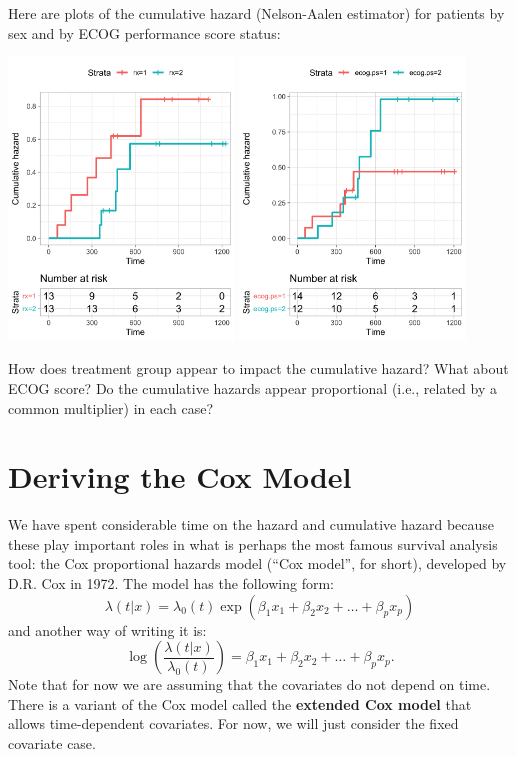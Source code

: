\begin{question}{}
Here are plots of the cumulative hazard (Nelson-Aalen estimator) for patients by sex and by ECOG performance score status:
\begin{center}
\includegraphics[width=0.45\textwidth]{img/ovarian-rx-cumhaz.png}
\hspace{4mm}
\includegraphics[width=0.45\textwidth]{img/ovarian-ecog-cumhaz.png}
\end{center}
How does treatment group appear to impact the cumulative hazard? What about ECOG score? Do the cumulative hazards appear proportional (i.e., related by a common multiplier) in each case? 
\end{question}


\section{Deriving the Cox Model}

We have spent considerable time on the hazard and cumulative hazard because these play important roles in what is perhaps the most famous survival analysis tool: the Cox proportional hazards model (``Cox model'', for short), developed by D.R. Cox in 1972. The model has the following form:
$$ \lambda(t|x) = \lambda_0(t)\exp(\beta_1 x_1 + \beta_2 x_2 + \dots + \beta_p x_p) $$
and another way of writing it is:
$$ \log \left( \frac{\lambda(t|x)}{\lambda_0(t)} \right) = \beta_1 x_1 + \beta_2 x_2 + \dots + \beta_p x_p. $$
Note that for now we are assuming that the covariates do not depend on time. There is a variant of the Cox model called the \textbf{extended Cox model} that allows time-dependent covariates. For now, we will just consider the fixed covariate case. 


